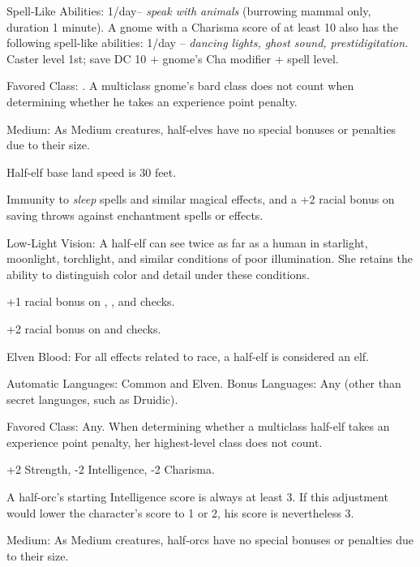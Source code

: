 Spell-Like Abilities: 1/day-- \textit{speak with animals }(burrowing mammal only, 
duration 1 minute). A gnome with a Charisma score of at least 10 also has the following 
spell-like abilities: 1/day -- \textit{dancing lights, ghost sound, prestidigitation. 
}Caster level 1st; save DC 10 + gnome's Cha modifier + spell level.

Favored Class: . A multiclass gnome's bard class does not count when determining 
whether he takes an experience point penalty.


Medium: As Medium creatures, half-elves have no special bonuses or penalties due 
to their size.

Half-elf base land speed is 30 feet.

Immunity to \textit{sleep }spells and similar magical effects, and a +2 racial 
bonus on saving throws against enchantment spells or effects.

Low-Light Vision: A half-elf can see twice as far as a human in starlight, moonlight, 
torchlight, and similar conditions of poor illumination. She retains the ability 
to distinguish color and detail under these conditions.

+1 racial bonus on , , and  checks.

+2 racial bonus on  and  checks.

Elven Blood: For all effects related to race, a half-elf is considered an elf.

Automatic Languages: Common and Elven. Bonus Languages: Any (other than secret 
languages, such as Druidic).

Favored Class: Any. When determining whether a multiclass half-elf takes an experience 
point penalty, her highest-level class does not count.


+2 Strength, -2 Intelligence, -2 Charisma.

A half-orc's starting Intelligence score is always at least 3. If this adjustment 
would lower the character's score to 1 or 2, his score is nevertheless 3.

Medium: As Medium creatures, half-orcs have no special bonuses or penalties due 
to their size.

